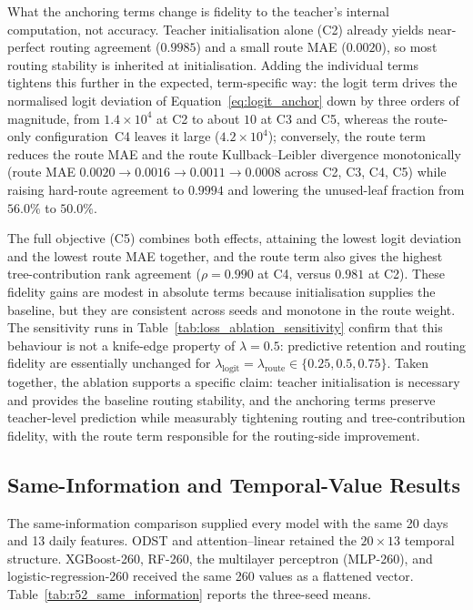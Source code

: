\smallskip
What the anchoring terms change is fidelity to the teacher's internal
computation, not accuracy. Teacher initialisation alone (C2) already yields
near-perfect routing agreement (\(0.9985\)) and a small route MAE
(\(0.0020\)), so most routing stability is inherited at initialisation.
Adding the individual terms tightens this further in the expected, term-specific
way: the logit term drives the normalised logit deviation of
Equation~\eqref{eq:logit_anchor} down by three orders of magnitude, from
\(1.4\times10^{4}\) at C2 to about \(10\) at C3 and C5, whereas the route-only
configuration~C4 leaves it large (\(4.2\times10^{4}\)); conversely, the route
term reduces the route MAE and the route Kullback--Leibler divergence
monotonically (route MAE \(0.0020\to0.0016\to0.0011\to0.0008\) across
C2, C3, C4, C5) while raising hard-route agreement to \(0.9994\) and lowering
the unused-leaf fraction from \(56.0\%\) to \(50.0\%\). 
\smallskip

The full objective (C5)
combines both effects, attaining the lowest logit deviation and the lowest
route MAE together, and the route term also gives the highest
tree-contribution rank agreement (\(\rho=0.990\) at C4, versus \(0.981\) at
C2). These fidelity gains are modest in absolute terms because initialisation
supplies the baseline, but they are consistent across seeds and monotone in
the route weight. The sensitivity runs in
Table~\ref{tab:loss_ablation_sensitivity} confirm that this behaviour is not a
knife-edge property of \(\lambda=0.5\): predictive retention and routing
fidelity are essentially unchanged for
\(\lambda_{\mathrm{logit}}=\lambda_{\mathrm{route}}\in\{0.25,0.5,0.75\}\).
Taken together, the ablation supports a specific claim: teacher initialisation
is necessary and provides the baseline routing stability, and the anchoring
terms preserve teacher-level prediction while measurably tightening routing and
tree-contribution fidelity, with the route term responsible for the
routing-side improvement.

\subsection{Same-Information and Temporal-Value Results}
\label{subsec:same_information_results}
The same-information comparison supplied every model with the same 20 days
and 13 daily features. ODST and attention--linear retained the
\(20\times13\) temporal structure. XGBoost-260, RF-260, the multilayer
perceptron (MLP-260), and logistic-regression-260 received the same 260
values as a flattened vector. Table~\ref{tab:r52_same_information} reports
the three-seed means.

